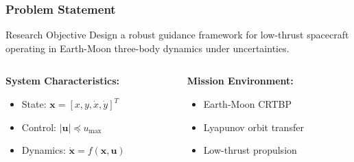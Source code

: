 \begin{frame}
	\frametitle{Problem Statement}
    \vspace{-0.35cm}
	\begin{block}{Research Objective}
		Design a robust guidance framework for low-thrust spacecraft operating in Earth-Moon three-body dynamics under uncertainties.
	\end{block}
	\vspace{.5cm}
	\begin{columns}[t]
		\begin{column}{0.5\textwidth}
			\textbf{System Characteristics:}
			\begin{itemize}
				\item State: $\mathbf{x} = [x, y, \dot{x}, \dot{y}]^T$
				\item Control: $|\mathbf{u}| \preceq u_{\max}$
				\item Dynamics: $\dot{\mathbf{x}} = f(\mathbf{x}, \mathbf{u})$
			\end{itemize}
		\end{column}
		\begin{column}{0.5\textwidth}
			\textbf{Mission Environment:}
			\begin{itemize}
				\item Earth-Moon CRTBP
				\item Lyapunov orbit transfer
				\item Low-thrust propulsion
			\end{itemize}
		\end{column}
	\end{columns}
	
\end{frame}